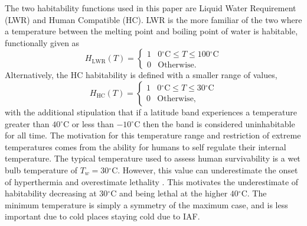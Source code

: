\documentclass[12pt, onecolumn]{revtex4-2}    %
\newcommand{\degreesC}{\ensuremath{^{\circ}\text{C}}}
\begin{document}
The two habitability functions used in this paper are Liquid Water Requirement (LWR) and Human Compatible (HC).
LWR is the more familiar of the two where a temperature between the melting point and boiling point of water is habitable, functionally given as
\begin{equation}
  H_\text{LWR}(T) =
  \begin{cases}
    1 & 0\degreesC \le T \le 100\degreesC \\
    0 & \text{Otherwise.}
  \end{cases}
  \label{eq:H_LWR}
\end{equation}
Alternatively, the HC habitability is defined with a smaller range of values,
\begin{equation}
  H_\text{HC}(T) =
  \begin{cases}
    1 & 0\degreesC \le T \le 30\degreesC \\
    0 & \text{Otherwise,}
  \end{cases}
  \label{eq:H_HC}
\end{equation}
with the additional stipulation that if a latitude band experiences a temperature greater than $40\degreesC$ or less than $-10\degreesC$ then the band is considered uninhabitable for all time.
The motivation for this temperature range and restriction of extreme temperatures comes from the ability for humans to self regulate their internal temperature.
The typical temperature used to assess human survivability is a wet bulb temperature of $T_w = 30\degreesC$.
However, this value can underestimate the onset of hyperthermia and overestimate lethality \cite{LuRomps2023}.
This motivates the underestimate of habitability decreasing at $30\degreesC$ and being lethal at the higher $40\degreesC$.
The minimum temperature is simply a symmetry of the maximum case, and is less important due to cold places staying cold due to IAF.
\end{document}
